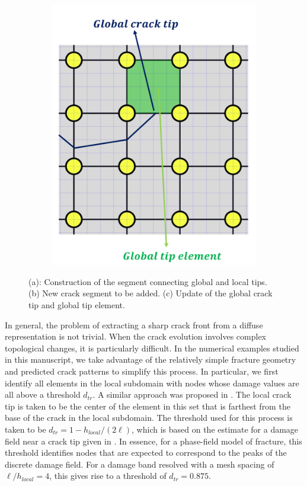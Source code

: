 \begin{figure}
\begin{subfigure}{.33\textwidth}
  \includegraphics[width=\linewidth]{img/Section2/schematic_3.png}
  \caption{}
  \label{fig:prop_3}
\end{subfigure}
\caption{(a): Construction of the segment connecting global and local tips.  (b) New crack segment to be added. (c) Update of the global crack tip and global tip element.}
  \label{fig:tip_progression}
\end{figure}

In general, the problem of extracting a sharp crack front from a diffuse representation is not trivial. When the crack evolution involves complex topological changes, it is particularly difficult\cite{tamayo2015medial}. In the numerical examples studied in this manuscript, we take advantage of the relatively simple fracture geometry and predicted crack patterns to simplify this process.  In particular, we first identify all elements in the local subdomain with nodes whose damage values are all above a threshold $d_{tr}$. A similar approach was proposed in \cite{giovanardi2017hybrid}. The local crack tip is taken to be the center of the element in this set that is farthest from the base of the crack in the local subdomain.  The threshold used for this process is taken to be $d_{tr} = 1 - h_{local}/(2\ell)$, which is based on the estimate for a damage field near a crack tip given in \cite{yoshioka2020crack}. In essence, for a phase-field model of fracture, this threshold identifies nodes that are expected to correspond to the peaks of the discrete damage field.  For a damage band resolved with a mesh spacing of $\ell / h_{local} = 4$, this gives rise to a threshold of  $d_{tr} = 0.875$. 

